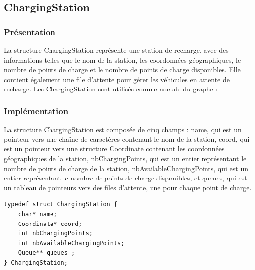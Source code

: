 \documentclass[french,a4paper]{article}
\begin{document}
\subsection{ChargingStation}

\subsubsection{Présentation}
La structure ChargingStation représente une station de recharge, avec des informations telles que le nom de la station, les coordonnées géographiques, le nombre de points de charge et le nombre de points de charge disponibles. Elle contient également une file d'attente pour gérer les véhicules en attente de recharge. Les ChargingStation sont utilisés comme noeuds du graphe :

\begin{center}
\end{center}

\subsubsection{Implémentation}
La structure ChargingStation est composée de cinq champs : name, qui est un pointeur vers une chaîne de caractères contenant le nom de la station, coord, qui est un pointeur vers une structure Coordinate contenant les coordonnées géographiques de la station, nbChargingPoints, qui est un entier représentant le nombre de points de charge de la station, nbAvailableChargingPoints, qui est un entier représentant le nombre de points de charge disponibles, et queues, qui est un tableau de pointeurs vers des files d'attente, une pour chaque point de charge. \\

\begin{center}
    \begin{lstlisting}[caption=Structure ChargingStation]
typedef struct ChargingStation {
    char* name;
    Coordinate* coord;
    int nbChargingPoints;
    int nbAvailableChargingPoints;
    Queue** queues ;
} ChargingStation;
        \end{lstlisting}
\end{center}
\end{document}
